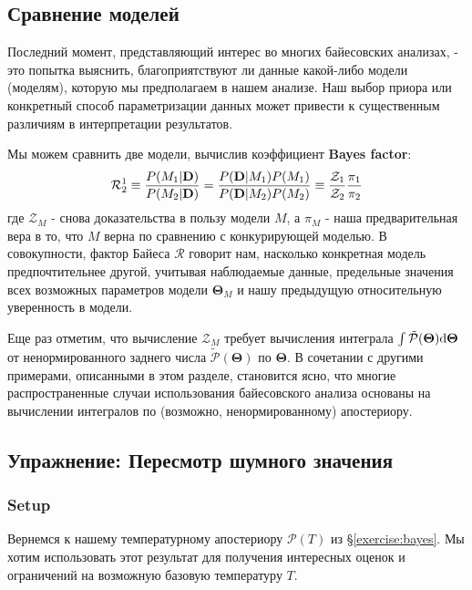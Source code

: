 \documentclass[12pt, titlepage]{article}
\newcommand{\deriv}{\ensuremath{{\rm d}}}  %
\newcommand{\params}{\ensuremath{\boldsymbol\Theta}}
\newcommand{\data}{\ensuremath{\mathbf{D}}}
\newcommand{\prior}{\ensuremath{\pi}}
\newcommand{\posterior}{\ensuremath{\mathcal{P}}}
\newcommand{\evidence}{\ensuremath{\mathcal{Z}}}
\newcommand{\bayesfactor}{\ensuremath{\mathcal{R}}}
\begin{document}
\subsection{Сравнение моделей} \label{subsec:evid}

Последний момент, представляющий интерес во многих байесовских анализах, - это попытка выяснить, благоприятствуют ли данные какой-либо модели (моделям), которую мы предполагаем в нашем анализе. Наш выбор приора или конкретный способ параметризации данных может привести к существенным различиям в интерпретации результатов.

Мы можем сравнить две модели, вычислив коэффициент \textbf{Bayes factor}:
\begin{equation}
    \bayesfactor^{1}_{2}
    \equiv \frac{P(M_{\rm 1}|\data)}{P(M_{\rm 2}|\data)}
    = \frac{P(\data|M_{\rm 1})P(M_{\rm 1})}{P(\data|M_{\rm 2})P(M_{\rm 2})}
    \equiv \frac{\evidence_{\rm 1}}{\evidence_{\rm 2}} 
    \frac{\prior_{\rm 1}}{\prior_{\rm 2}}
\end{equation}
где $\evidence_M$ - снова доказательства в пользу модели $M$, а $\prior_M$ - наша предварительная вера в то, что $M$ верна по сравнению с конкурирующей моделью. В совокупности, фактор Байеса $\bayesfactor$ говорит нам, насколько конкретная модель предпочтительнее другой, учитывая наблюдаемые данные, предельные значения всех возможных параметров модели $\params_M$ и нашу предыдущую относительную уверенность в модели.

Еще раз отметим, что вычисление $\evidence_M$ требует вычисления интеграла $\int \tilde{\posterior}(\params) \deriv \params$ от ненормированного заднего числа $\tilde{\posterior}(\params)$ по $\params$. В сочетании с другими примерами, описанными в этом разделе, становится ясно, что многие распространенные случаи использования байесовского анализа основаны на вычислении интегралов по (возможно, ненормированному) апостериору.

\subsection*{Упражнение: Пересмотр шумного значения} \label{exercise:practice}

\subsubsection*{Setup}

Вернемся к нашему температурному апостериору $\posterior(T)$ из \S\ref{exercise:bayes}. Мы хотим использовать этот результат для получения интересных оценок и ограничений на возможную базовую температуру $T$.
\end{document}
